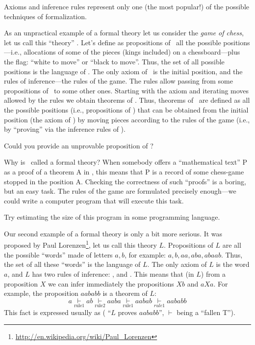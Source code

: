 Axioms and inference rules represent only one (the most popular!) of the possible techniques of formalization.

As an unpractical example of a formal theory let us consider the \emph{game of chess}, let us call this ``theory'' \CHESS.
Let's define as propositions of \CHESS\ all the possible positions---i.e., allocations of some of the pieces (kings included) on a chessboard---plus the flag: ``white to move'' or ``black to move''.
Thus, the set of all possible positions is the language of \CHESS.
The only axiom of \CHESS\ is the initial position, and the rules of inference---the rules of the game.
The rules allow passing from some propositions of \CHESS\ to some other ones.
Starting with the axiom and iterating moves allowed by the rules we obtain theorems of \CHESS.
Thus, theorems of \CHESS\ are defined as all the possible positions (i.e., propositions of \CHESS) that can be obtained from the initial position (the axiom of \CHESS) by moving pieces according to the rules of the game (i.e., by ``proving'' via the inference rules of \CHESS).

\begin{exercise}
Could you provide an unprovable proposition of \CHESS?
\end{exercise}

Why is \CHESS\ called a formal theory? When somebody offers a ``mathematical text'' P as a proof of a theorem A in \CHESS, this means that P is a record of some chess-game stopped in the position A.
Checking the correctness of such ``proofs'' is a boring, but an easy task.
The rules of the game are formulated precisely enough---we could write a computer program that will execute this task.

\begin{exercise}
Try estimating the size of this program in some programming language.
\end{exercise}

Our second example of a formal theory is only a bit more serious.
It was proposed by Paul Lorenzen\footnote{\url{http://en.wikipedia.org/wiki/Paul\_Lorenzen}}, let us call this theory \(L\).
Propositions of \(L\) are all the possible ``words'' made of letters \(a, b\), for example: \(a, b, aa, aba, abaab\).
Thus, the set of all these ``words'' is the language of \(L\).
The only axiom of \(L\) is the word \(a\), and \(L\) has two rules of inference: , and .
This means that (in \(L\)) from a proposition \(X\) we can infer immediately the propositions \(Xb\) and \(aXa\).
For example, the proposition \(aababb\) is a theorem of \(L\):
\[
a \underset{\text{rule1}}{\vdash} ab \underset{\text{rule2}}{\vdash} aaba \underset{\text{rule1}}{\vdash} aabab \underset{rule1}{\vdash} aababb
\]
This fact is expressed usually as  ( ``\(L\) proves \(aababb\)'', \(\vdash\) being a ``fallen T'').

